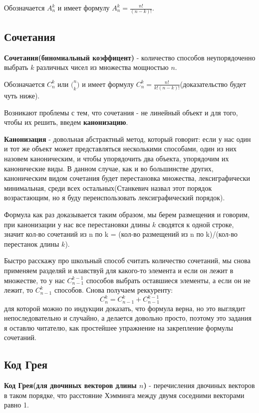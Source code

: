 \documentclass{article}
\begin{document}
Обозначается $A_n^k$ и имеет формулу $A_n^k = \frac{n!}{(n-k)!}$.

\subsection{Сочетания}
\textbf{Сочетания(биномиальный коэффицент)} - количество способов неупорядоченно выбрать $k$ различных чисел из множества мощностью $n$.

Обозначается $C_n^k$ или $\big(_k^n\big)$ и имеет формулу $C_n^k = \frac{n!}{k!(n-k)!}$(доказательство будет чуть ниже).

Возникают проблемы с тем, что сочетания - не линейный объект и для того, чтобы их решить, введем \textbf{канонизацию}.

\textbf{Канонизация} - довольная абстрактный метод, который говорит: если у нас один и тот же объект может представляться несколькими способами, один из них назовем каноническим, и чтобы упорядочить два объекта, упорядочим их канонические виды. В данном случае, как и во большинстве других, каноническим видом сочетания будет перестановка множества, лексиграфически минимальная, среди всех остальных(Станкевич назвал этот порядок возрастающим, но я буду переиспользовать лексиграфический порядок).

Формула как раз доказывается таким образом, мы берем размещения и говорим, при канонизации у нас все перестановки длины $k$ сводятся к одной строке, значит кол-во сочетаний из n по k = (кол-во размещений из n по k)/(кол-во перестанок длины $k$).

Быстро расскажу про школьный способ считать количество сочетаний, мы снова применяем разделяй и влавствуй для какого-то элемента и если он лежит в множестве, то у нас $C_{n-1}^{k-1}$ способов выбрать оставшиеся элементы, а если он не лежит, то $C_{n - 1}^k$ способов. Снова получаем реккуренту: $$C_n^k=C_{n-1}^k+C_{n-1}^{k-1}$$ для которой можно по индукции доказать, что формула верна, но это выглядит непоследовательно и случайно, а делается довольно просто, поэтому это задания я оставлю читателю, как простейшее упражнение на закрепление формулы сочетаний.

\subsection{Код Грея}
\textbf{Код Грея(для двочиных векторов длины $n$)} - перечисления двочиных векторов в таком порядке, что расстояние Хэмминга между двумя соседними векторами равно 1.
\end{document}
